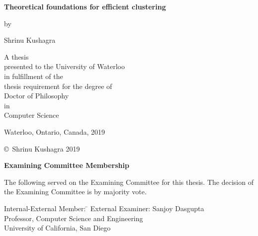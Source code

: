 \documentclass[letterpaper,12pt,titlepage,oneside,final]{book}
\let\origdoublepage\cleardoublepage
\newcommand{\clearemptydoublepage}{%
  \clearpage{\pagestyle{empty}\origdoublepage}}
\let\cleardoublepage\clearemptydoublepage
\begin{document}
\fi
\pagestyle{empty}

\begin{titlepage}
        \begin{center}
        \vspace*{1.0cm}

        \Huge
        {\bf Theoretical foundations for efficient clustering}

        \vspace*{1.0cm}

        \normalsize
        by \\

        \vspace*{1.0cm}

        \Large
        Shrinu Kushagra \\

        \vspace*{3.0cm}

        \normalsize
        A thesis \\
        presented to the University of Waterloo \\ 
        in fulfillment of the \\
        thesis requirement for the degree of \\
        Doctor of Philosophy \\
        in \\
        Computer Science \\

        \vspace*{2.0cm}

        Waterloo, Ontario, Canada, 2019 \\

        \vspace*{1.0cm}

        \copyright\ Shrinu Kushagra 2019 \\
        \end{center}
\end{titlepage}

\pagestyle{plain}
\setcounter{page}{2}

\cleardoublepage
\begin{center}\textbf{Examining Committee Membership}\end{center}
  \noindent
The following served on the Examining Committee for this thesis. The decision of the Examining Committee is by majority vote.
  \bigskip
  
  \noindent
\begin{tabbing}
Internal-External Member: \=  \kill %
External Examiner: \>  Sanjoy Dasgupta \\ 
\> Professor, Computer Science and Engineering\\ \> University of California, San Diego \\
\end{tabbing} 
  \bigskip
  
\end{document}
